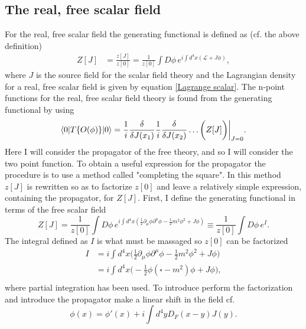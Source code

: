 \subsection*{The real, free scalar field}
For the real, free scalar field the generating functional is defined as (cf. the above definition)
\begin{equation}
	\begin{split}
		Z[J]&=\frac{z[J]}{z[0]}=\frac{1}{z[0]}\int D\phi \, e^{i\int d^4x(\mathcal{L}+J\phi)},
	\end{split}
\end{equation} 
where $J$ is the source field for the scalar field theory and the Lagrangian density for a real, free scalar field is given by equation \eqref{Lagrange scalar}. The n-point functions for the real, free scalar field theory is found from the generating functional by using
\begin{equation}
	\braket{0|T\{O(\phi)\}|0}=\frac{1}{i}\frac{\delta}{\delta J(x_1)}\frac{1}{i}\frac{\delta}{\delta J(x_2)}\dots \bigg(Z[J]\bigg)\bigg|_{J=0}.
\end{equation} 
Here I will consider the propagator of the free theory, and so I will consider the two point function. To obtain a useful expression for the propagator the procedure is to use a method called "completing the square". In this method $z[J]$ is rewritten so as to factorize $z[0]$ and leave a relatively simple expression, containing the propagator, for $Z[J]$. First, I define the generating functional in terms of the free scalar field
\begin{equation}
Z[J]=\frac{1}{z[0]}\int D\phi \, e^{i\int d^4x(\frac{1}{2}\partial_\mu\phi\partial^\mu\phi-\frac{1}{2}m^2\phi^2+J\phi)}\equiv\frac{1}{z[0]}\int D\phi \, e^{I}.
\end{equation} 
The integral defined as $I$ is what must be massaged so $z[0]$ can be factorized
\begin{equation}
	\begin{split}
		I&=i\int d^4x\bigg(\frac{1}{2}\partial_\mu\phi\partial^\mu\phi-\frac{1}{2}m^2\phi^2+J\phi\bigg)\\
		&=i\int d^4x\bigg(-\frac{1}{2}\phi(\square-m^2)\phi+J\phi\bigg),\\
	\end{split}
\end{equation} 
where partial integration has been used. To introduce perform the factorization and introduce the propagator make a linear shift in the field cf.
\begin{equation}
	\phi(x)=\phi'(x)+i\int d^4y D_F(x-y)J(y).
\end{equation} 
